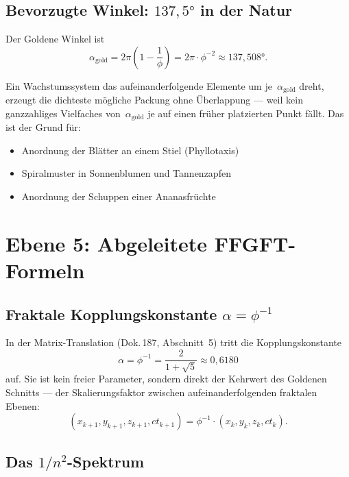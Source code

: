 \subsection{Bevorzugte Winkel: $137{,}5°$ in der Natur}

Der Goldene Winkel ist
\begin{equation}
  \alpha_{\text{gold}} = 2\pi \left(1 - \frac{1}{\phi}\right)
  = 2\pi \cdot \phi^{-2}
  \approx 137{,}508°.
\end{equation}

Ein Wachstumssystem das aufeinanderfolgende Elemente um je~$\alpha_{\text{gold}}$
dreht, erzeugt die dichteste mögliche Packung ohne Überlappung — weil
kein ganzzahliges Vielfaches von~$\alpha_{\text{gold}}$ je auf einen
früher platzierten Punkt fällt. Das ist der Grund für:
\begin{itemize}
  \item Anordnung der Blätter an einem Stiel (Phyllotaxis)
  \item Spiralmuster in Sonnenblumen und Tannenzapfen
  \item Anordnung der Schuppen einer Ananasfrüchte
\end{itemize}

\section{Ebene 5: Abgeleitete FFGFT-Formeln}

\subsection{Fraktale Kopplungskonstante $\alpha = \phi^{-1}$}

In der Matrix-Translation (Dok.\,187, Abschnitt~5) tritt die Kopplungskonstante
\begin{equation}
  \alpha = \phi^{-1} = \frac{2}{1+\sqrt{5}} \approx 0{,}6180
\end{equation}
auf. Sie ist kein freier Parameter, sondern direkt der Kehrwert des
Goldenen Schnitts — der Skalierungsfaktor zwischen aufeinanderfolgenden
fraktalen Ebenen:
\begin{equation}
  (x_{k+1}, y_{k+1}, z_{k+1}, ct_{k+1}) = \phi^{-1} \cdot
  (x_k, y_k, z_k, ct_k).
\end{equation}

\subsection{Das $1/n^2$-Spektrum}

